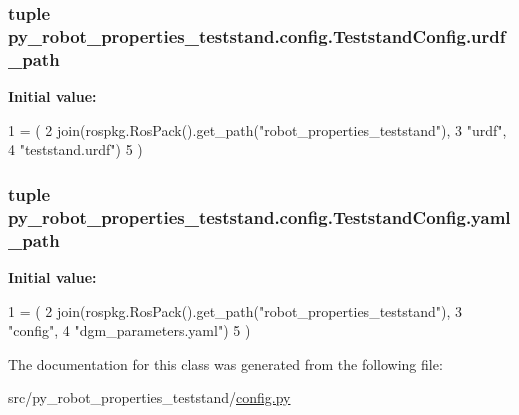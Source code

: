\subsubsection[{\texorpdfstring{urdf\+\_\+path}{urdf_path}}]{\setlength{\rightskip}{0pt plus 5cm}tuple py\+\_\+robot\+\_\+properties\+\_\+teststand.\+config.\+Teststand\+Config.\+urdf\+\_\+path\hspace{0.3cm}{\ttfamily [static]}}\hypertarget{classpy__robot__properties__teststand_1_1config_1_1TeststandConfig_ae8b0e21a78fe89c48b707028bc892559}{}\label{classpy__robot__properties__teststand_1_1config_1_1TeststandConfig_ae8b0e21a78fe89c48b707028bc892559}
{\bfseries Initial value\+:}
\begin{DoxyCode}
1 = (
2         join(rospkg.RosPack().get\_path(\textcolor{stringliteral}{"robot\_properties\_teststand"}),
3              \textcolor{stringliteral}{"urdf"},
4              \textcolor{stringliteral}{"teststand.urdf"})
5     )
\end{DoxyCode}
\subsubsection[{\texorpdfstring{yaml\+\_\+path}{yaml_path}}]{\setlength{\rightskip}{0pt plus 5cm}tuple py\+\_\+robot\+\_\+properties\+\_\+teststand.\+config.\+Teststand\+Config.\+yaml\+\_\+path\hspace{0.3cm}{\ttfamily [static]}}\hypertarget{classpy__robot__properties__teststand_1_1config_1_1TeststandConfig_acc7f8bb5b23a6ec613194e217e41fb25}{}\label{classpy__robot__properties__teststand_1_1config_1_1TeststandConfig_acc7f8bb5b23a6ec613194e217e41fb25}
{\bfseries Initial value\+:}
\begin{DoxyCode}
1 = (
2         join(rospkg.RosPack().get\_path(\textcolor{stringliteral}{"robot\_properties\_teststand"}),
3              \textcolor{stringliteral}{"config"},
4              \textcolor{stringliteral}{"dgm\_parameters.yaml"})
5     )
\end{DoxyCode}


The documentation for this class was generated from the following file\+:\begin{DoxyCompactItemize}
\item 
src/py\+\_\+robot\+\_\+properties\+\_\+teststand/\hyperlink{config_8py}{config.\+py}\end{DoxyCompactItemize}
